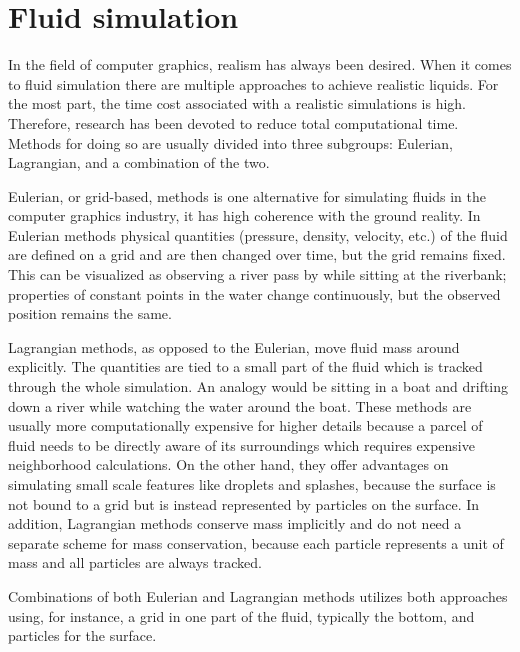 \documentclass[../../main.tex]{subfiles}
\begin{document}
\tracingall

\section{Fluid simulation}
In the field of computer graphics, realism has always been desired. When it comes to fluid simulation there are multiple approaches to achieve realistic liquids. For the most part, the time cost associated with a realistic simulations is high. Therefore, research has been devoted to reduce total computational time. Methods for doing so are usually divided into three subgroups: Eulerian, Lagrangian, and a combination of the two.

Eulerian, or grid-based, methods is one alternative for simulating fluids in the computer graphics industry, it has high coherence with the ground reality. In Eulerian methods physical quantities (pressure, density, velocity, etc.) of the fluid are defined on a grid and are then changed over time, but the grid remains fixed. This can be visualized as observing a river pass by while sitting at the riverbank; properties of constant points in the water change continuously, but the observed position remains the same. 

Lagrangian methods, as opposed to the Eulerian, move fluid mass around explicitly. The quantities are tied to a small part of the fluid which is tracked through the whole simulation. An analogy would be sitting in a boat and drifting down a river while watching the water around the boat. These methods are usually more computationally expensive for higher details because a parcel of fluid needs to be directly aware of its surroundings which requires expensive neighborhood calculations. On the other hand, they offer advantages on simulating small scale features like droplets and splashes, because the surface is not bound to a grid but is instead represented by particles on the surface. In addition, Lagrangian methods conserve mass implicitly and do not need a separate scheme for mass conservation, because each particle represents a unit of mass and all particles are always tracked. 

Combinations of both Eulerian and Lagrangian methods utilizes both approaches using, for instance, a grid in one part of the fluid, typically the bottom, and particles for the surface.
\end{document}
